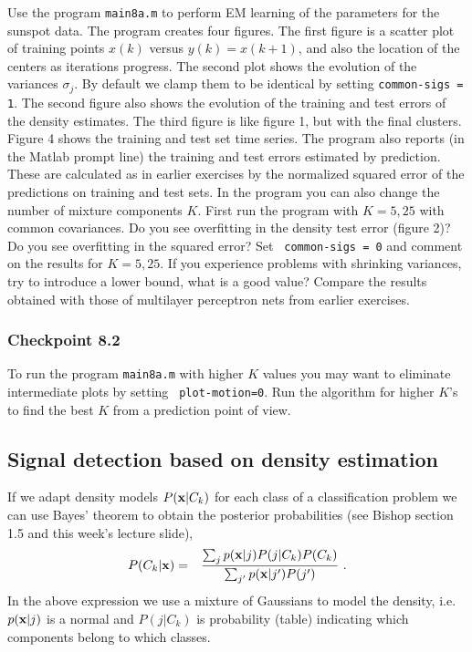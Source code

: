 \documentclass[12pt]{article}    %
\def\xb{{\bf x}}
\begin{document}
Use the program {\tt main8a.m} to perform EM learning of the
parameters for the sunspot data. The program creates four figures.
The first figure is a scatter plot of training points $x(k)$
versus $y(k) =x(k+1)$, and also the location of the centers as
iterations progress. The second plot shows the evolution of the
variances $\sigma_j$. By default we clamp them to be identical by
setting {\tt common-sigs = 1}. The second figure also shows the
evolution of the training and test errors of the density
estimates. The third figure is like figure 1, but with the final
clusters. Figure 4 shows the training and test set time series.
The program also reports (in the Matlab prompt line) the training
and test errors estimated by prediction. These are calculated as
in earlier exercises by the normalized squared error of the
predictions on training and test sets. In the program you can
also change the number of mixture components $K$. First run the
program with $K=5,25$ with common covariances. Do you see
overfitting in the density test error (figure 2)? Do you see overfitting in the
squared error? Set {\tt
common-sigs = 0} and comment on the results for $K = 5,25$. If you
experience problems with shrinking variances, try to introduce a
lower bound, what is a good value? Compare the results obtained
with those of multilayer perceptron nets from earlier exercises.


\subsubsection*{Checkpoint 8.2}

To run the program {\tt main8a.m} with higher $K$ values you may
want to eliminate intermediate plots by setting {\tt
plot-motion=0}. Run the algorithm for higher $K$'s to find the
best $K$ from a prediction point of view.


\subsection*{Signal detection based on density estimation}

If we adapt density models $P(\xb|C_k)$ for each class of a
classification problem we can use Bayes' theorem to obtain the
posterior probabilities (see Bishop section 1.5 and this week's
lecture slide),
\begin{eqnarray}
P(C_k|\xb) & =&  \frac{\sum_{j}p(\xb|j) P(j|C_{k})P(C_k)}{\sum_{j'}p(\xb|j')P(j')} \ .
 \nonumber
\end{eqnarray}
In the above expression we use a mixture of Gaussians to model the density, i.e.\ $p(\xb|j)$
is a normal and $P(j|C_{k})$ is probability (table) indicating which components belong to
which classes.
\end{document}
